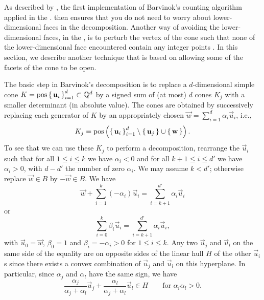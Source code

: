 As described by , the first
implementation of Barvinok's counting algorithm applied
  in the .
  then ensures that you
do not need to worry about lower-dimensional faces in the decomposition.
Another way of avoiding the lower-dimensional faces, in the ,
is to perturb the vertex of the cone such that none of the lower-dimensional
face encountered contain any integer points .
In this section, we describe another technique that is based on allowing
some of the facets of the cone to be open.

The basic step in Barvinok's decomposition is to replace a
$d$-dimensional simple cone 
$K = \poshull \lb\, \vec u_i \,\rb_{i=1}^d \subset \QQ^d$
by a signed sum of (at most) $d$ cones $K_j$
with a smaller determinant (in absolute value).
The cones are obtained by successively replacing each generator
of $K$ by an appropriately chosen
$\vec w = \sum_{i=1}^d \alpha_i \vec u_i$, i.e.,
\begin{equation}
\label{eq:K_j}
K_j = 
\poshull \left(\lb\, \vec u_i \,\rb_{i=1}^d 
\setminus \{\, \vec u_j \,\} \cup \{\, \vec w \,\}\right)
.
\end{equation}
To see that we can use these $K_j$ to perform a decomposition,
rearrange the $\vec u_i$ such that for all $1 \le i \le k$ we have
$\alpha_i < 0$ and for all $k+1 \le i \le d'$ we have $\alpha_i > 0$,
with $d - d'$ the number of zero $\alpha_i$.
We may assume $k < d'$; otherwise replace $\vec w \in B$ by
$-\vec w \in B$.  We have
$$
\vec w + \sum_{i=1}^k (-\alpha_i) \vec u_i =
\sum_{i=k+1}^{d'} \alpha_i \vec u_i
$$
or
\begin{equation}
\label{eq:sub}
\sum_{i=0}^k \beta_i \vec u_i =
\sum_{i=k+1}^{d'} \alpha_i \vec u_i
,
\end{equation}
with $\vec u_0 = \vec w$, $\beta_0 = 1$ and $\beta_i = -\alpha_i > 0$
for $1 \le i \le k$.  Any two $\vec u_j$ and $\vec u_l$ on the same side
of the equality are on opposite sides of the linear hull $H$ of
the other $\vec u_i$s since there exists a convex combination
of $\vec u_j$ and $\vec u_l$ on this hyperplane.
In particular, since $\alpha_j$ and $\alpha_l$ have the same sign,
we have
\begin{equation}
\label{eq:opposite}
\frac {\alpha_j}{\alpha_j+\alpha_l} \vec u_j
+
\frac {\alpha_l}{\alpha_j+\alpha_l} \vec u_l
\in H
\qquad\text{for $\alpha_i \alpha_l > 0$}
.
\end{equation}
